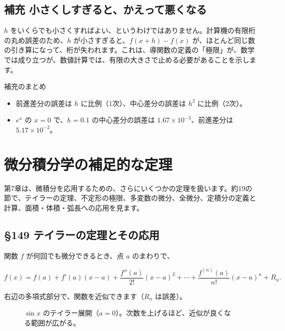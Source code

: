 \documentclass[a4paper,11pt,openany]{ltjsbook}
\begin{document}
\section{補充 小さくしすぎると、かえって悪くなる}

$h$ をいくらでも小さくすればよい、というわけではありません。計算機の有限桁の丸め誤差のため、$h$ が小さすぎると、$f(x+h)-f(x)$ が、ほとんど同じ数の引き算になって、桁が失われます。これは、導関数の定義の「極限」が、数学では成り立つが、数値計算では、有限の大きさで止める必要があることを示します。

\begin{pointbox}{補充のまとめ}
\begin{itemize}[leftmargin=*]
\item 前進差分の誤差は $h$ に比例（1次）、中心差分の誤差は $h^2$ に比例（2次）。
\item $e^x$ の $x=0$ で、$h=0.1$ の中心差分の誤差は $1.67\times10^{-3}$、前進差分は $5.17\times10^{-2}$。
\end{itemize}
\end{pointbox}

\chapter{微分積分学の補足的な定理}

第7章は、微積分を応用するための、さらにいくつかの定理を扱います。約19の節で、テイラーの定理、不定形の極限、多変数の微分、全微分、定積分の定義と計算、面積・体積・弧長への応用を見ます。

\section{§149 テイラーの定理とその応用}

関数 $f$ が何回でも微分できるとき、点 $a$ のまわりで、

\[
f(x)=f(a)+f'(a)(x-a)+\frac{f''(a)}{2!}(x-a)^2+\cdots+\frac{f^{(n)}(a)}{n!}(x-a)^n+R_n.
\]

右辺の多項式部分で、関数を近似できます（$R_n$ は誤差）。

\begin{figure}[htbp]
\centering
{}
\caption{$\sin x$ のテイラー展開（$a=0$）。次数を上げるほど、近似が良くなる範囲が広がる。}
\end{figure}
\end{document}

